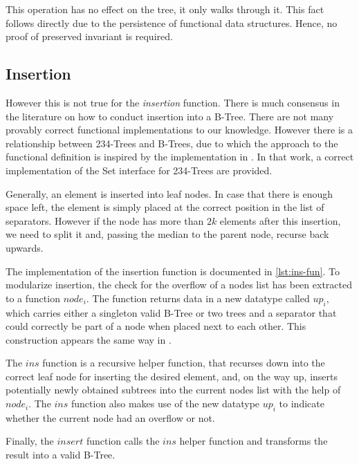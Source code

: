 This operation has no effect on the tree, it only walks through it.
This fact follows directly due to the persistence of functional data structures.
Hence, no proof of preserved invariant is required.

\subsection{Insertion}

However this is not true for the \textit{insertion} function.
There is much consensus in the literature on how to conduct insertion into a B-Tree.
There are not many provably correct functional implementations to our knowledge.
However there is a relationship between 234-Trees and B-Trees,
due to which the approach to the functional definition is inspired by the implementation
in \parencite{DBLP:conf/itp/Nipkow16}.
In that work, a correct implementation of the Set interface for 234-Trees 
are provided.

Generally, an element is inserted into leaf nodes.
In case that there is enough space left, the element is simply placed at the correct
position in the list of separators.
However if the node has more than $2k$ elements after this insertion,
we need to split it and, passing the median to the parent node,
recurse back upwards.

The implementation of the insertion function is documented in \autoref{lst:ins-fun}.
To modularize insertion, the check for the overflow of a nodes list has been
extracted to a function $node_i$.
The function returns data in a new datatype called $up_i$, which
carries either a singleton valid B-Tree or two trees and a separator
that could correctly be part of a node when placed next to each other.
This construction appears the same way in \parencite{DBLP:conf/itp/Nipkow16}.

The $ins$ function is a recursive helper function,
that recurses down into the correct leaf node for inserting the desired element,
and, on the way up, inserts potentially newly obtained subtrees into the
current nodes list with the help of $node_i$.
The $ins$ function also makes use of the new datatype $up_i$ to indicate whether
the current node had an overflow or not.

Finally, the $insert$ function calls the $ins$ helper function
and transforms the result into a valid B-Tree.

